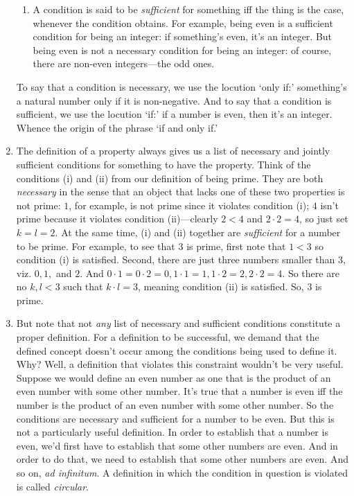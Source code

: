 \begin{enumerate}[{\thesection}.1]
\begin{enumerate}[\thesection.{20}.a]
			\item A condition is said to be \emph{sufficient} for something iff the thing is the case, whenever the condition obtains. For example, being even is a sufficient condition for being an integer: if something's even, it's an integer. But being even is not a necessary condition for being an integer: of course, there are non-even integers---the odd ones.		
			
			\end{enumerate}
		
	To say that a condition is necessary, we use the locution `only if:' something's a natural number only if it is non-negative. And to say that a condition is sufficient, we use the locution `if:' if a number is even, then it's an integer. Whence the origin of the phrase `if and only if.'
		
	\item The definition of a property always gives us a list of necessary and jointly sufficient conditions for something to have the property. Think of the conditions (i) and (ii) from our definition of being prime. They are both \emph{necessary} in the sense that an object that lacks one of these two properties is not prime: $1$, for example, is not prime since it violates condition (i); $4$ isn't prime because it violates condition (ii)---clearly $2<4$ and $2\cdot 2=4$, so just set $k=l=2$. At the same time, (i) and (ii) together are \emph{sufficient} for a number to be prime. For example, to see that $3$ is prime, first note that $1<3$ so condition (i) is satisfied. Second, there are just three numbers smaller than 3, viz. $0,1,$ and $2$. And $0\cdot 1=0\cdot 2= 0, 1\cdot 1=1, 1\cdot 2=2, 2\cdot 2=4$. So there are no $k,l<3$ such that $k\cdot l=3$, meaning condition (ii) is satisfied. So, $3$ is prime.
	
		\item But note that not \emph{any} list of necessary and sufficient conditions constitute a proper definition. For a definition to be successful, we demand that the defined concept doesn't occur among the conditions being used to define it. Why? Well, a definition that violates this constraint wouldn't be very useful. Suppose we would define an even number as one that is the product of an even number with some other number. It's true that a number is even iff the number is the product of an even number with some other number. So the conditions are necessary and sufficient for a number to be even. But this is not a particularly useful definition. In order to establish that a number is even, we'd first have to establish that some other numbers are even. And in order to do that, we need to establish that some other numbers are even. And so on, \emph{ad infinitum}. A definition in which the condition in question is violated is called \emph{circular}.
		

\end{enumerate}
